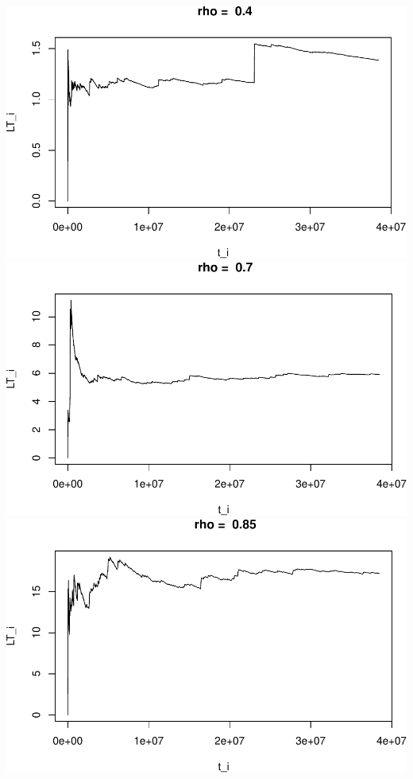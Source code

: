 \documentclass[]{article}
\begin{document}
\includegraphics{003_files/figure-latex/unnamed-chunk-12-1.pdf}
\includegraphics{003_files/figure-latex/unnamed-chunk-12-2.pdf}
\includegraphics{003_files/figure-latex/unnamed-chunk-12-3.pdf}
\end{document}

